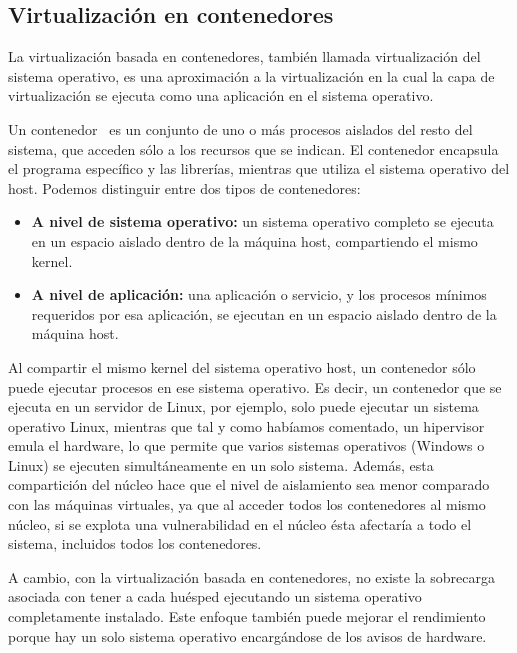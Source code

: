 	\clearpage

\subsection{Virtualización en contenedores} \label{sec:cont}
	La virtualización basada en contenedores, también llamada virtualización del sistema operativo, es una aproximación a la virtualización en la cual la capa de virtualización se ejecuta como una aplicación en el sistema operativo.

	Un contenedor~\cite{cont1} es un conjunto de uno o más procesos aislados del resto del sistema, que acceden sólo a los recursos que se indican. El contenedor encapsula el programa específico y las librerías, mientras que utiliza el sistema operativo del host. Podemos distinguir entre dos tipos de contenedores:~\cite{cont2}

	\begin{itemize}
		\item \textbf{A nivel de sistema operativo:} un sistema operativo completo se ejecuta en un espacio aislado dentro de la máquina host, compartiendo el mismo kernel.
		\item \textbf{A nivel de aplicación:} una aplicación o servicio, y los procesos mínimos requeridos por esa aplicación, se ejecutan en un espacio aislado dentro de la máquina host.
	\end{itemize}

	Al compartir el mismo kernel del sistema operativo host, un contenedor sólo puede ejecutar procesos en ese sistema operativo. Es decir, un contenedor que se ejecuta en un servidor de Linux, por ejemplo, solo puede ejecutar un sistema operativo Linux, mientras que tal y como habíamos comentado, un hipervisor emula el hardware, lo que permite que varios sistemas operativos (Windows o Linux) se ejecuten simultáneamente en un solo sistema. Además, esta compartición del núcleo hace que el nivel de aislamiento sea menor comparado con las máquinas virtuales, ya que al acceder todos los contenedores al mismo núcleo, si se explota una vulnerabilidad en el núcleo ésta afectaría a todo el sistema, incluidos todos los contenedores.

	A cambio, con la virtualización basada en contenedores, no existe la sobrecarga asociada con tener a cada huésped ejecutando un sistema operativo completamente instalado. Este enfoque también puede mejorar el rendimiento porque hay un solo sistema operativo encargándose de los avisos de hardware.

